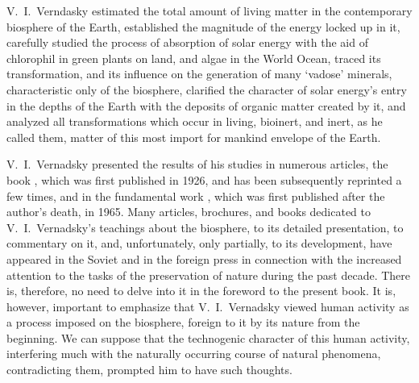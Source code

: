 V.~I.\ Verndasky estimated the total amount of living matter in the
contemporary biosphere of the Earth, established the magnitude of the energy
locked up in it, carefully studied the process of absorption of solar energy
with the aid of chlorophil in green plants on land, and algae in the World
Ocean, traced its transformation, and its influence on the generation of many
`vadose' minerals, characteristic only of the
biosphere, clarified the character of solar energy's entry in the depths of the
Earth with the deposits of organic matter created by it, and analyzed all
transformations which occur in living, bioinert, and inert, as he called them,
matter of this most import for mankind envelope of the Earth.

V.~I.\ Vernadsky presented the results of his studies in numerous articles, the
book , which was first published in 1926, and has
been subsequently reprinted a few times, and in the fundamental work
, which was first published after the author's
death, in 1965.  Many articles, brochures, and books dedicated to V.~I.\ 
Vernadsky's teachings about the biosphere, to its detailed presentation, to
commentary on it, and, unfortunately, only partially, to its development, have
appeared in the Soviet and in the foreign press in connection with the
increased attention to the tasks of the preservation of
nature during the past decade.  There is,
therefore, no need to delve into it in the foreword to the present book.  It
is, however, important to emphasize that V.~I.\ Vernadsky viewed human activity
as a process imposed on the biosphere, foreign to it by its
nature from the beginning.  We can suppose that the technogenic character of
this human activity, interfering much with the naturally occurring course of
natural phenomena,\footnoteRus{естественный ход природных процессов}
contradicting them, prompted him to have such thoughts.

